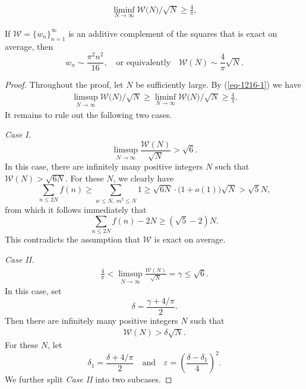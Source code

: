 \documentclass[10pt,a4paper]{amsart}
\begin{document}
\begin{align}\label{eq-1216-1}
\liminf_{N\rightarrow\infty}\mathcal{W}\big(N\big)/\sqrt{N}\ge \frac{4}{\pi}, 
\end{align}

\begin{theorem}\label{thm:3}
If $\mathcal{W}=\{w_n\}_{n=1}^{\infty}$ is an additive complement of the squares that is exact on average, then 
$$
w_n \sim \frac{\pi^2 n^2}{16},  \quad \text{or~equivalently} \quad \mathcal{W}(N)\sim \frac{4}{\pi}\sqrt{N}.
$$
\end{theorem}

\begin{proof}
Throughout the proof, let $N$ be sufficiently large. By (\ref{eq-1216-1}) we have
\begin{align*}
\limsup_{N\rightarrow\infty}\mathcal{W}\big(N\big)/\sqrt{N}\ge \liminf_{N\rightarrow\infty}\mathcal{W}\big(N\big)/\sqrt{N}\ge \frac{4}{\pi}.
\end{align*}
It remains to rule out the following two cases.

{\it Case I.} 
$$
\limsup_{N\rightarrow\infty}\frac{\mathcal{W}(N)}{\sqrt{N}}>\sqrt{6}.
$$
In this case, there are infinitely many positive integers $N$ such that
$
\mathcal{W}(N)>\sqrt{6N}.
$
For these $N$, we clearly have
$$
\sum_{n\le 2N}f(n)\ge \sum_{w\le N,\ m^2\le N}1\ge \sqrt{6N}\cdot \big(1+o(1)\big)\sqrt{N}>\sqrt{5}N,
$$
from which it follows immediately that
$$
\sum_{n\le 2N}f(n)-2N\ge (\sqrt{5}-2)N.
$$
This contradicts the assumption that $\mathcal{W}$ is exact on average.

{\it Case II.} 
\begin{align*}
\frac{4}{\pi}<\limsup_{N\rightarrow\infty}\frac{\mathcal{W}(N)}{\sqrt{N}}=\gamma\le \sqrt{6}.
\end{align*}
In this case, set 
$$
\delta=\frac{\gamma+4/\pi}{2}.
$$
Then there are infinitely many positive integers $N$ such that
\begin{align}\label{eq-1215-1}
\mathcal{W}(N)>\delta \sqrt{N}.
\end{align} 
For these $N$, let 
$$
\delta_1=\frac{\delta+4/\pi}{2} \quad \text{and} \quad \varepsilon=\left(\frac{\delta-\delta_1}{4}\right)^2.
$$ 
We further split {\it Case II} into two subcases.


\end{proof}
\end{document}
